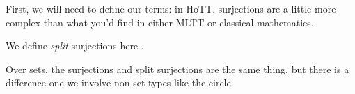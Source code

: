 First, we will need to define our terms: in HoTT, surjections are a little more
complex than what you'd find in either MLTT or classical mathematics.
\begin{definition} \label{split-surjections}
  We define \emph{split} surjections here \cite[definition
  4.6.1]{hottbook}.
  \begin{agdalisting} \label{sp-surj-eqn}
  \end{agdalisting} \vspace{-1.5\baselineskip}
  \begin{agdalisting} \label{sp-surj-arrow-eqn}
  \end{agdalisting}
\end{definition}
Over sets, the surjections and split surjections are the same thing, but there
is a difference one we involve non-set types like the circle.

